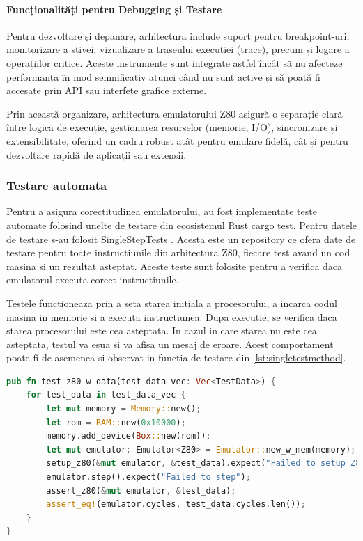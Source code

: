 \documentclass[titlepage,12pt]{article}
\DeclareRobustCommand{\code}[1]{{\ttfamily\small #1}}
\begin{document}
\paragraph{Funcționalități pentru Debugging și Testare}

Pentru dezvoltare și depanare, arhitectura include suport pentru breakpoint-uri, monitorizare a stivei, vizualizare a traseului execuției (trace), precum și logare a operațiilor critice. Aceste instrumente sunt integrate astfel încât să nu afecteze performanța în mod semnificativ atunci când nu sunt active și să poată fi accesate prin API sau interfețe grafice externe.

\bigskip

Prin această organizare, arhitectura emulatorului Z80 asigură o separație clară între logica de execuție, gestionarea resurselor (memorie, I/O), sincronizare și extensibilitate, oferind un cadru robust atât pentru emulare fidelă, cât și pentru dezvoltare rapidă de aplicații sau extensii.

\subsubsection{Testare automata}

Pentru a asigura corectitudinea emulatorului, au fost implementate teste automate folosind unelte de testare din ecosistemul Rust \code {cargo test}.
Pentru datele de testare s-au folosit SingleStepTests \cite {ref:singlesteptestsz80}. Acesta este un repository ce ofera date de testare pentru toate instructiunile din arhitectura Z80, fiecare test avand un cod masina si un rezultat asteptat. Aceste teste sunt folosite pentru a verifica daca emulatorul executa corect instructiunile.

Testele functioneaza prin a seta starea initiala a procesorului, a incarca codul masina in memorie si a executa instructiunea. Dupa executie, se verifica daca starea procesorului este cea asteptata. In cazul in care starea nu este cea asteptata, testul va esua si va afisa un mesaj de eroare. Acest comportament poate fi de asemenea si observat in functia de testare din \ref {lst:singletestmethod}.

\begin{lstlisting}[language=Rust,caption={Metoda de testare a unei singure instructiuni},label={lst:singletestmethod}]
pub fn test_z80_w_data(test_data_vec: Vec<TestData>) {
    for test_data in test_data_vec {
        let mut memory = Memory::new();
        let rom = RAM::new(0x10000);
        memory.add_device(Box::new(rom));
        let mut emulator: Emulator<Z80> = Emulator::new_w_mem(memory);
        setup_z80(&mut emulator, &test_data).expect("Failed to setup Z80");
        emulator.step().expect("Failed to step");
        assert_z80(&mut emulator, &test_data);
        assert_eq!(emulator.cycles, test_data.cycles.len());
    }
}
\end{lstlisting}
\end{document}
